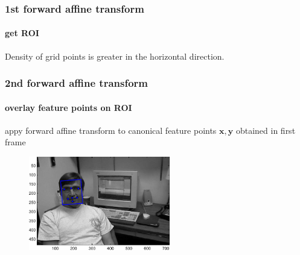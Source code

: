 \begin{frame}[plain]
\frametitle{1st forward affine transform}
\framesubtitle{get ROI}
\logoCSIPCPL\mypagenum
\begin{changemargin}{-1.3in}{0in}
Density of grid points is greater in the horizontal direction.
\begin{figure}[t]
\centering
{}
\end{figure}
\end{changemargin}
\end{frame}


\begin{frame}
\frametitle{2nd forward affine transform}
\framesubtitle{overlay feature points on ROI}
appy forward affine transform to canonical feature points $\mathbf{x,y}$ obtained in first frame
\logoCSIPCPL\mypagenum
\scriptsize
\begin{figure}[t]
\centering
\includegraphics[width=0.55\textwidth]{thesis/dataset_Dudek_with_feature_points_00001.pdf}
\label{Fig:overall}
\end{figure}
\end{frame}


